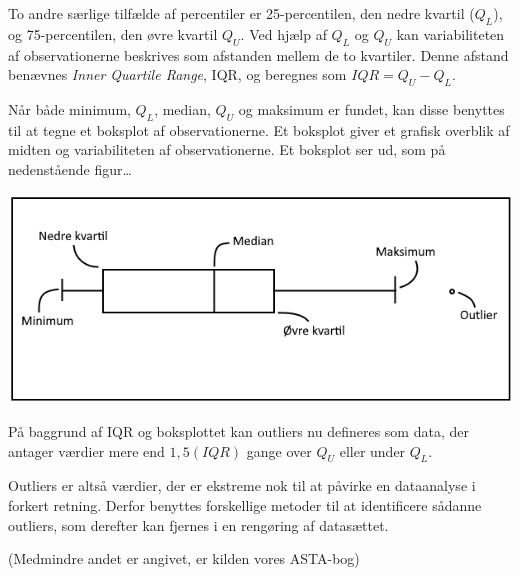 \documentclass[]{book}
\theoremstyle{definition}
\theoremstyle{definition}
\theoremstyle{definition}
\theoremstyle{remark}
\begin{document}
To andre særlige tilfælde af percentiler er 25-percentilen, den nedre kvartil (\(Q_L\)), og 75-percentilen, den øvre kvartil \(Q_U\). Ved hjælp af \(Q_L\) og \(Q_U\) kan variabiliteten af observationerne beskrives som afstanden mellem de to kvartiler. Denne afstand benævnes \emph{Inner Quartile Range}, IQR, og beregnes som \(IQR = Q_U - Q_L\).

Når både minimum, \(Q_L\), median, \(Q_U\) og maksimum er fundet, kan disse benyttes til at tegne et boksplot af observationerne. Et boksplot giver et grafisk overblik af midten og variabiliteten af observationerne. Et boksplot ser ud, som på nedenstående figur\ldots{}

\begin{center}\includegraphics[width=0.75\linewidth]{images/Boksplot} \end{center}

På baggrund af IQR og boksplottet kan outliers nu defineres som data, der antager værdier mere end \(1,5(IQR)\) gange over \(Q_U\) eller under \(Q_L\).

Outliers er altså værdier, der er ekstreme nok til at påvirke en dataanalyse i forkert retning. Derfor benyttes forskellige metoder til at identificere sådanne outliers, som derefter kan fjernes i en rengøring af datasættet.

(Medmindre andet er angivet, er kilden vores ASTA-bog)


\end{document}
